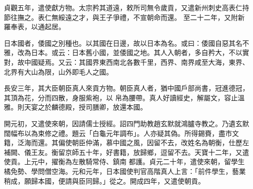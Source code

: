 \begin{pinyinscope}
 貞觀五年，遣使獻方物。太宗矜其道遠，敕所司無令歲貢，又遣新州刺史高表仁持節往撫之。表仁無綏遠之才，與王子爭禮，不宣朝命而還。
 至二十二年，又附新羅奉表，以通起居。



 日本國者，倭國之別種也。以其國在日邊，故以日本為名。或曰：倭國自惡其名不雅，改為日本。或云：日本舊小國，並倭國之地。其人入朝者，多自矜大，不以實對，故中國疑焉。又云：其國界東西南北各數千里，西界、南界咸至大海，東界、北界有大山為限，山外即毛人之國。



 長安三年，其大臣朝臣真人來貢方物。朝臣真人者，猶中國戶部尚書，冠進德冠，其頂為花，分而四散，身服紫袍，以
 帛為腰帶。真人好讀經史，解屬文，容止溫雅。則天宴之於麟德殿，授司膳卿，放還本國。



 開元初，又遣使來朝，因請儒士授經。詔四門助教趙玄默就鴻臚寺教之。乃遺玄默闊幅布以為束修之禮。題云「白龜元年調布」。人亦疑其偽。所得錫賚，盡市文籍，泛海而還。其偏使朝臣仲滿，慕中國之風，因留不去，改姓名為朝衡，仕歷左補闕、儀王友。衡留京師五十年，好書籍，放歸鄉，逗留不去。天寶十二年，又遣使貢。上元中，擢衡為左散騎常侍、鎮南
 都護。貞元二十年，遣使來朝，留學生橘免勢、學問僧空海。元和元年，日本國使判官高階真人上言：「前件學生，藝業稍成，願歸本國，便請與臣同歸。」從之。開成四年，又遣使朝貢。



\end{pinyinscope}